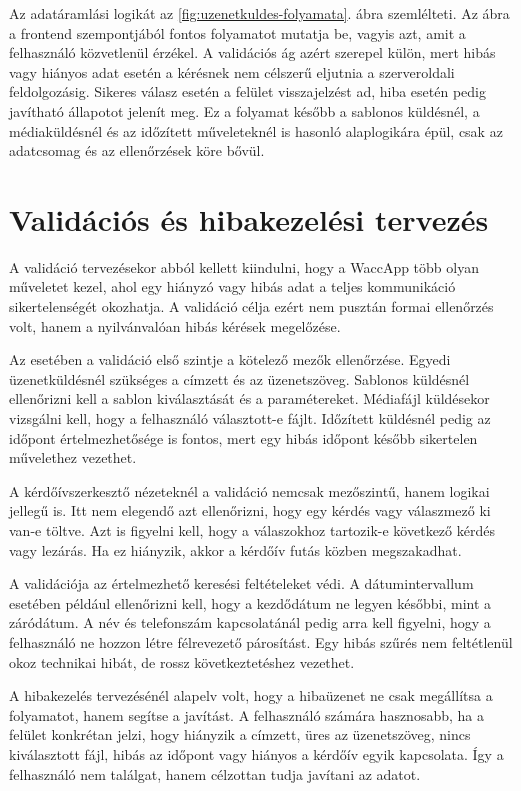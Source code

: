 Az adatáramlási logikát az \ref{fig:uzenetkuldes-folyamata}. ábra szemlélteti. Az ábra a frontend szempontjából fontos folyamatot mutatja be, vagyis azt, amit a felhasználó közvetlenül érzékel. A validációs ág azért szerepel külön, mert hibás vagy hiányos adat esetén a kérésnek nem célszerű eljutnia a szerveroldali feldolgozásig. Sikeres válasz esetén a felület visszajelzést ad, hiba esetén pedig javítható állapotot jelenít meg. Ez a folyamat később a sablonos küldésnél, a médiaküldésnél és az időzített műveleteknél is hasonló alaplogikára épül, csak az adatcsomag és az ellenőrzések köre bővül.

\section{Validációs és hibakezelési tervezés}

A validáció tervezésekor abból kellett kiindulni, hogy a WaccApp több olyan műveletet kezel, ahol egy hiányzó vagy hibás adat a teljes kommunikáció sikertelenségét okozhatja. A validáció célja ezért nem pusztán formai ellenőrzés volt, hanem a nyilvánvalóan hibás kérések megelőzése.

Az  esetében a validáció első szintje a kötelező mezők ellenőrzése. Egyedi üzenetküldésnél szükséges a címzett és az üzenetszöveg. Sablonos küldésnél ellenőrizni kell a sablon kiválasztását és a paramétereket. Médiafájl küldésekor vizsgálni kell, hogy a felhasználó választott-e fájlt. Időzített küldésnél pedig az időpont értelmezhetősége is fontos, mert egy hibás időpont később sikertelen művelethez vezethet.

A kérdőívszerkesztő nézeteknél a validáció nemcsak mezőszintű, hanem logikai jellegű is. Itt nem elegendő azt ellenőrizni, hogy egy kérdés vagy válaszmező ki van-e töltve. Azt is figyelni kell, hogy a válaszokhoz tartozik-e következő kérdés vagy lezárás. Ha ez hiányzik, akkor a kérdőív futás közben megszakadhat.

A  validációja az értelmezhető keresési feltételeket védi. A dátumintervallum esetében például ellenőrizni kell, hogy a kezdődátum ne legyen későbbi, mint a záródátum. A név és telefonszám kapcsolatánál pedig arra kell figyelni, hogy a felhasználó ne hozzon létre félrevezető párosítást. Egy hibás szűrés nem feltétlenül okoz technikai hibát, de rossz következtetéshez vezethet.

A hibakezelés tervezésénél alapelv volt, hogy a hibaüzenet ne csak megállítsa a folyamatot, hanem segítse a javítást. A felhasználó számára hasznosabb, ha a felület konkrétan jelzi, hogy hiányzik a címzett, üres az üzenetszöveg, nincs kiválasztott fájl, hibás az időpont vagy hiányos a kérdőív egyik kapcsolata. Így a felhasználó nem találgat, hanem célzottan tudja javítani az adatot.

